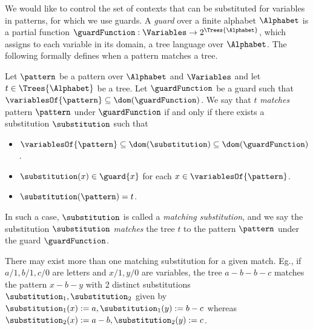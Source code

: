 We would like to control the set of contexts that can be substituted for variables in patterns, for which we use guards. A \emph{guard} over a finite alphabet $\Alphabet$ is a partial function $\guardFunction : \Variables \to 2^{\Trees{\Alphabet}}$, which assigns to each variable in its domain, a tree language over $\Alphabet$. The following formally defines when a pattern matches a tree.
\begin{definition}[Match]\label{def:match}
    Let $\pattern$ be a pattern over $\Alphabet$ and $\Variables$ and let $t \in \Trees{\Alphabet}$ be a tree. Let $\guardFunction$ be a guard such that $\variablesOf{\pattern} \subseteq \dom(\guardFunction)$. We say that $t$ \emph{matches} pattern $\pattern$ under $\guardFunction$ if and only if there exists a substitution $\substitution$ such that
    \begin{itemize}
        \item $\variablesOf{\pattern} \subseteq \dom(\substitution) \subseteq \dom(\guardFunction)$.
        \item $\substitution(x) \in \guard{x}$ for each $x \in \variablesOf{\pattern}$.
        \item $\substitution(\pattern) = t$.
    \end{itemize}
    In such a case, $\substitution$ is called a \emph{matching substitution}, and we say the substitution $\substitution$ \emph{matches} the tree $t$ to the pattern $\pattern$ under the guard $\guardFunction$.
\end{definition}

There may exist more than one matching substitution for a given match. Eg., if $a/1, b/1, c/0$ are letters and $x/1, y/0$ are variables, the tree $a-b-b-c$ matches the pattern $x-b-y$ with 2 distinct substitutions $\substitution_1, \substitution_2$ given by $\substitution_1(x) := a, \substitution_1(y) := b-c$ whereas $\substitution_2(x) := a-b, \substitution_2(y) := c$.

